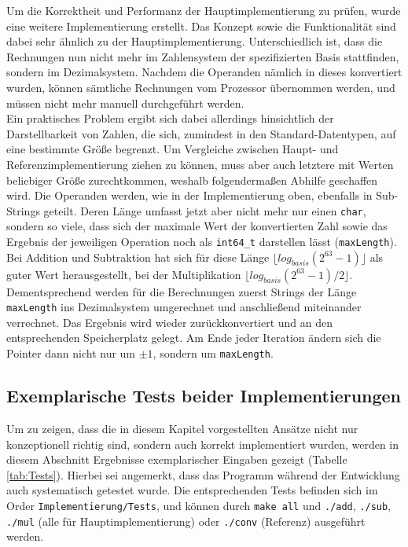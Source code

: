 \documentclass[course=erap]{aspdoc}
\begin{document}
    Um die Korrektheit und Performanz der Hauptimplementierung zu prüfen, wurde eine weitere Implementierung erstellt. Das Konzept sowie die
    Funktionalität sind dabei sehr ähnlich zu der Hauptimplementierung. Unterschiedlich ist, dass die Rechnungen nun nicht mehr im Zahlensystem
    der spezifizierten Basis stattfinden, sondern im Dezimalsystem. Nachdem die Operanden nämlich in dieses konvertiert wurden, können sämtliche
    Rechnungen vom Prozessor übernommen werden, und müssen nicht mehr manuell durchgeführt werden.\\
    \newline
    Ein praktisches Problem ergibt sich dabei allerdings hinsichtlich der Darstellbarkeit von Zahlen, die sich, zumindest in den
    Standard-Datentypen, auf eine bestimmte Größe begrenzt. Um Vergleiche zwischen Haupt- und Referenzimplementierung ziehen zu können, muss
    aber auch letztere mit Werten beliebiger Größe zurechtkommen, weshalb folgendermaßen Abhilfe geschaffen wird. Die Operanden werden, wie in
    der Implementierung oben, ebenfalls in Sub-Strings geteilt. Deren Länge umfasst jetzt aber nicht mehr nur einen \verb+char+, sondern so viele,
    dass sich der maximale Wert der konvertierten Zahl sowie das Ergebnis der jeweiligen Operation noch als \verb+int64_t+ darstellen lässt
    (\verb+maxLength+). Bei Addition und Subtraktion hat sich für diese Länge $\lfloor log_{basis}(2^{63} - 1)\rfloor $ als guter Wert herausgestellt, bei der
    Multiplikation $\lfloor log_{basis}(2^{63} - 1) / 2\rfloor $.\\
    \newline
    Dementsprechend werden für die Berechnungen zuerst Strings der Länge \verb+maxLength+ ins Dezimalsystem umgerechnet und anschließend miteinander
    verrechnet. Das Ergebnis wird wieder zurückkonvertiert und an den entsprechenden Speicherplatz gelegt. Am Ende jeder Iteration ändern sich
    die Pointer dann nicht nur um $\pm1$, sondern um \verb+maxLength+.

    \subsection{Exemplarische Tests beider Implementierungen}

    Um zu zeigen, dass die in diesem Kapitel vorgestellten Ansätze nicht nur konzeptionell richtig sind, sondern auch korrekt implementiert
    wurden, werden in diesem Abschnitt Ergebnisse exemplarischer Eingaben gezeigt (Tabelle \ref{tab:Tests}). Hierbei sei angemerkt, dass das
    Programm während der Entwicklung auch systematisch getestet wurde. Die entsprechenden Tests befinden sich im Order
    \verb+Implementierung/Tests+, und können durch \verb+make all+  und \verb+./add+, \verb+./sub+, \verb+./mul+ (alle für Hauptimplementierung)
    oder \verb+./conv+ (Referenz) ausgeführt werden.
\end{document}
